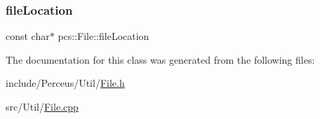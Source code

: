 \subsubsection{\texorpdfstring{file\+Location}{fileLocation}}
{\footnotesize\ttfamily const char$\ast$ pcs\+::\+File\+::file\+Location\hspace{0.3cm}{\ttfamily [protected]}}



The documentation for this class was generated from the following files\+:\begin{DoxyCompactItemize}
\item 
include/\+Perceus/\+Util/\hyperlink{File_8h}{File.\+h}\item 
src/\+Util/\hyperlink{File_8cpp}{File.\+cpp}\end{DoxyCompactItemize}

